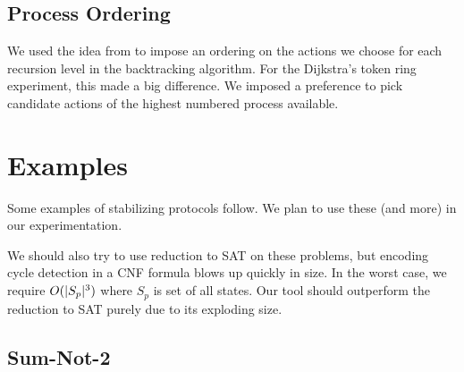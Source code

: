 
\subsection{Process Ordering}

We used the idea from \cite{ipdpsEbnenasir11} to impose an ordering on the actions we choose for each recursion level in the backtracking algorithm.
For the Dijkstra's token ring experiment, this made a big difference.
We imposed a preference to pick candidate actions of the highest numbered process available.



\section{Examples}
Some examples of stabilizing protocols follow.
We plan to use these (and more) in our experimentation.

We should also try to use reduction to SAT on these problems, but encoding cycle detection in a CNF formula blows up quickly in size.
In the worst case, we require $O(\lvert S_p\rvert^3)$ where $S_p$ is set of all states.
Our tool should outperform the reduction to SAT purely due to its exploding size.

\subsection{Sum-Not-2}

